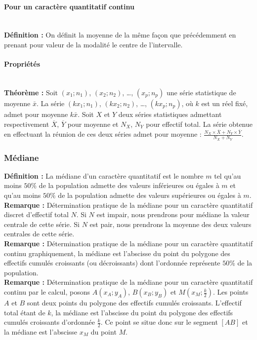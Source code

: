 \documentclass[a4paper,titlepage]{article}
\begin{document}
            \paragraph{Pour un caractère quantitatif continu}\mbox{}\\
                \textbf{Définition :} On définit la moyenne de la même façon que précédemment en prenant pour valeur de la modalité le centre de l’intervalle.
            \paragraph{Propriétés}\mbox{}\\
                \textbf{Théorème :} Soit $\left(x_{1};n_{1}\right)$, $\left(x_{2};n_{2}\right)$, \ldots, $\left(x_{p};n_{p}\right)$ une série statistique de moyenne $\bar{x}$. La série $\left(kx_{1};n_{1}\right)$, $\left(kx_{2};n_{2}\right)$, \ldots, $\left(kx_{p};n_{p}\right)$, où $k$ est un réel fixé, admet pour moyenne $k\bar{x}$. Soit $X$ et $Y$ deux séries statistiques admettant respectivement $\overline{X}$, $\overline{Y}$ pour moyenne et $N_{X}$, $N_{Y}$ pour effectif total. La série obtenue en effectuant la réunion de ces deux séries admet pour moyenne : $\frac{N_{X}\times\overline{X}+N_{Y}\times\overline{Y}}{N_{X}+N_{Y}}$.
        \subsubsection{Médiane}
            \textbf{Définition :} La médiane d’un caractère quantitatif est le nombre $m$ tel qu’au moins $50\%$ de la population admette des valeurs inférieures ou égales à $m$ et qu’au moins $50\%$ de la population admette des valeurs supérieures ou égales à $m$.
            \\
            \textbf{Remarque :} Détermination pratique de la médiane pour un caractère quantitatif discret d’effectif total $N$. Si $N$ est impair, nous prendrons pour médiane la valeur centrale de cette série. Si $N$ est pair, nous prendrons la moyenne des deux valeurs centrales de cette série.
            \\
            \textbf{Remarque :} Détermination pratique de la médiane pour un caractère quantitatif continu graphiquement, la médiane est l’abscisse du point du polygone des effectifs cumulés croissants (ou décroissants) dont l’ordonnée représente $50\%$ de la population.
            \\
            \textbf{Remarque :} Détermination pratique de la médiane pour un caractère quantitatif continu par le calcul, posons $A\left(x_{A};y_{A}\right)$, $B\left(x_{B};y_{B}\right)$ et $M\left(x_{M};\frac{k}{2}\right)$. Les points $A$ et $B$ sont deux points du polygone des effectifs cumulés croissants. L’effectif total étant de $k$, la médiane est l’abscisse du point du polygone des effectifs cumulés croissants d’ordonnée $\frac{k}{2}$. Ce point se situe donc sur le segment $\left[AB\right]$ et la médiane est l’abscisse $x_{M}$ du point $M$.
\end{document}

